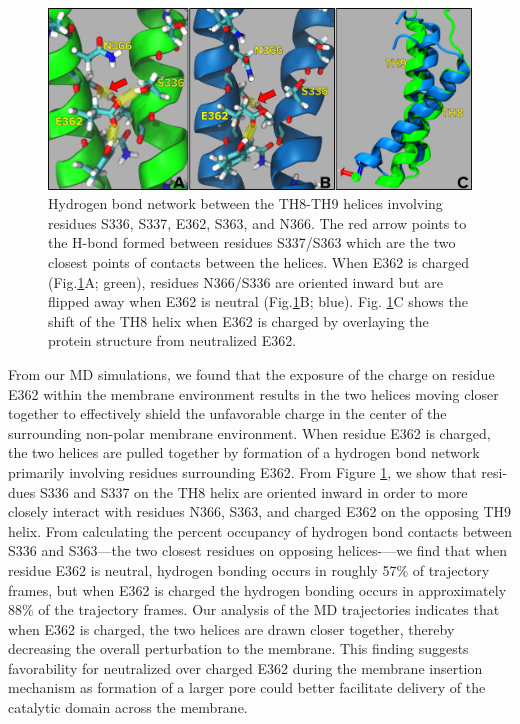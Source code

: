 \begin{figure}[H]
\centering
\includegraphics[width=\linewidth,]{Figures/DTT/hbonds_compare.png}
\caption{Hydrogen bond network between the TH8-TH9 helices involving residues S336, S337, E362, S363, and N366. The red arrow points to the H-bond formed between residues S337/S363 which are the two closest points of contacts between the helices. When E362 is charged (Fig.\ref{fig:dtt_hbonds}A; green), residues N366/S336 are oriented inward but are flipped away when E362 is neutral (Fig.\ref{fig:dtt_hbonds}B; blue). Fig. \ref{fig:dtt_hbonds}C shows the shift of the TH8 helix when E362 is charged by overlaying the protein structure from neutralized E362.}
\label{fig:dtt_hbonds}
\end{figure}

From our MD simulations, we found that the exposure of the charge on residue E362 within the membrane environment results in the two helices moving closer together to effectively shield the unfavorable charge in the center of the surrounding non-polar membrane environment. 
When residue E362 is charged, the two helices are pulled together by formation of a hydrogen bond network primarily involving residues surrounding E362.
From Figure \ref{fig:dtt_hbonds}, we show that resi- dues S336 and S337 on the TH8 helix are oriented inward in order to more closely interact with residues N366, S363, and charged E362 on the opposing TH9 helix.
From calculating the percent occupancy of hydrogen bond contacts between S336 and S363—the two closest residues on opposing helices-—we find that when residue E362 is neutral, hydrogen bonding occurs in roughly 57\% of trajectory frames, but when E362 is charged the hydrogen bonding occurs in approximately 88\% of the trajectory frames.
Our analysis of the MD trajectories indicates that when E362 is charged, the two helices are drawn closer together, thereby decreasing the overall perturbation to the membrane.
This finding suggests favorability for neutralized over charged E362 during the membrane insertion mechanism as formation of a larger pore could better facilitate delivery of the catalytic domain across the membrane.

